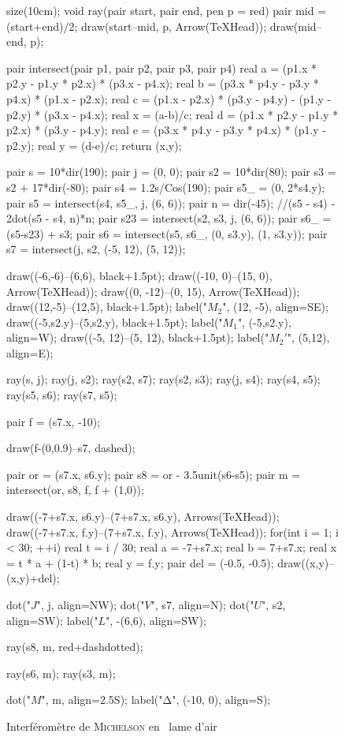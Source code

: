 \documentclass[a4paper, 11pt]{article}
\let\gguillemotleft\guillemotleft
\let\gguillemotright\guillemotright
\def\guillemotleft{\textsf{\gguillemotleft}}
\def\guillemotright{\textsf{\gguillemotright}}
\begin{document}
	\begin{figure}[H]
		\centering
		\begin{asy}
			size(10cm);
			void ray(pair start, pair end, pen p = red) {
				pair mid = (start+end)/2;
				draw(start--mid, p, Arrow(TeXHead));
				draw(mid--end, p);
			}

			pair intersect(pair p1, pair p2, pair p3, pair p4) {
				real a = (p1.x * p2.y - p1.y * p2.x) * (p3.x - p4.x);
				real b = (p3.x * p4.y - p3.y * p4.x) * (p1.x - p2.x);
				real c = (p1.x - p2.x) * (p3.y - p4.y) - (p1.y - p2.y) * (p3.x - p4.x);
				real x = (a-b)/c;
				real d = (p1.x * p2.y - p1.y * p2.x) * (p3.y - p4.y);
				real e = (p3.x * p4.y - p3.y * p4.x) * (p1.y - p2.y);
				real y = (d-e)/c;
				return (x,y);
			}

			pair s = 10*dir(190);
			pair j = (0, 0);
			pair s2 = 10*dir(80);
			pair s3 = s2 + 17*dir(-80);
			pair s4 = 1.2s/Cos(190);
			pair s5_ = (0, 2*s4.y);
			pair s5 = intersect(s4, s5_, j, (6, 6));
			pair n = dir(-45);
			//(s5 - s4) - 2dot(s5 - s4, n)*n;
			pair s23 = intersect(s2, s3, j, (6, 6));
			pair s6_ = (s5-s23) + s3;
			pair s6 = intersect(s5, s6_, (0, s3.y), (1, s3.y));
			pair s7 = intersect(j, s2, (-5, 12), (5, 12));

			draw((-6,-6)--(6,6), black+1.5pt);
			draw((-10, 0)--(15, 0), Arrow(TeXHead));
			draw((0, -12)--(0, 15), Arrow(TeXHead));
			draw((12,-5)--(12,5), black+1.5pt);
			label("$M_2$", (12, -5), align=SE);
			draw((-5,s2.y)--(5,s2.y), black+1.5pt);
			label("$M_1$", (-5,s2.y), align=W);
			draw((-5, 12)--(5, 12), black+1.5pt);
			label("$M_2'$", (5,12), align=E);

			ray(s, j);
			ray(j, s2);
			ray(s2, s7);
			ray(s2, s3);
			ray(j, s4);
			ray(s4, s5);
			ray(s5, s6);
			ray(s7, s5);

			pair f = (s7.x, -10);

			draw(f-(0,0.9)--s7, dashed);

			pair or = (s7.x, s6.y);
			pair s8 = or - 3.5unit(s6-s5);
			pair m = intersect(or, s8, f, f + (1,0));

			draw((-7+s7.x, s6.y)--(7+s7.x, s6.y), Arrows(TeXHead));
			draw((-7+s7.x, f.y)--(7+s7.x, f.y), Arrows(TeXHead));
			for(int i = 1; i < 30; ++i) {
				real t = i / 30;
				real a = -7+s7.x;
				real b = 7+s7.x;
				real x = t * a + (1-t) * b;
				real y = f.y;
				pair del = (-0.5, -0.5);
				draw((x,y)--(x,y)+del);
			}

			dot("$J$", j, align=NW);
			dot("$V$", s7, align=N);
			dot("$U$", s2, align=SW);
			label("$L$", -(6,6), align=SW);

			ray(s8, m, red+dashdotted);

			ray(s6, m);
			ray(s3, m);

			dot("$M$", m, align=2.5S);
			label("$\mathrm{\Delta}$", (-10, 0), align=S);
		\end{asy}
		\caption{Interféromètre de \textsc{Michelson} en \guillemotleft~lame d'air~\guillemotright}
	\end{figure}
\end{document}
